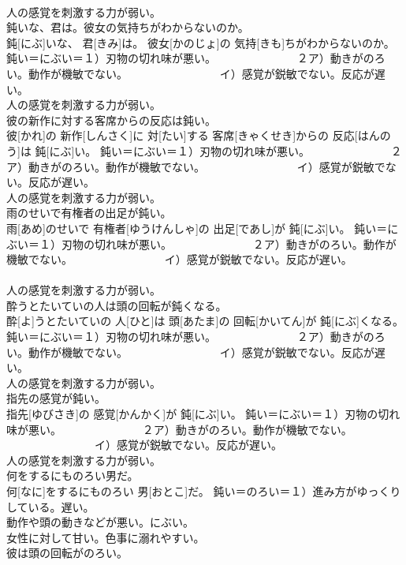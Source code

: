 \documentclass[8pt]{extreport}
\begin{document}
\begin{CJK}{UTF8}{min}
{\\	人の感覚を刺激する力が弱い。
\\	鈍いな、君は。彼女の気持ちがわからないのか。	
\\	鈍[にぶ]いな、 君[きみ]は。 彼女[かのじょ]の 気持[きも]ちがわからないのか。	鈍い＝にぶい＝１）刃物の切れ味が悪い。 　　　　　　　２ア）動きがのろい。動作が機敏でない。 　　　　　　　　イ）感覚が鋭敏でない。反応が遅い。 　　　　　　　
\\	人の感覚を刺激する力が弱い。
\\	彼の新作に対する客席からの反応は鈍い。	
\\	彼[かれ]の 新作[しんさく]に 対[たい]する 客席[きゃくせき]からの 反応[はんのう]は 鈍[にぶ]い。	鈍い＝にぶい＝１）刃物の切れ味が悪い。 　　　　　　　２ア）動きがのろい。動作が機敏でない。 　　　　　　　　イ）感覚が鋭敏でない。反応が遅い。 　　　　　　　
\\	人の感覚を刺激する力が弱い。
\\	雨のせいで有権者の出足が鈍い。	
\\	雨[あめ]のせいで 有権者[ゆうけんしゃ]の 出足[であし]が 鈍[にぶ]い。	鈍い＝にぶい＝１）刃物の切れ味が悪い。 　　　　　　　２ア）動きがのろい。動作が機敏でない。 　　　　　　　　イ）感覚が鋭敏でない。反応が遅い。 　　　　　　　
\\	人の感覚を刺激する力が弱い。
\\	酔うとたいていの人は頭の回転が鈍くなる。	
\\	酔[よ]うとたいていの 人[ひと]は 頭[あたま]の 回転[かいてん]が 鈍[にぶ]くなる。	鈍い＝にぶい＝１）刃物の切れ味が悪い。 　　　　　　　２ア）動きがのろい。動作が機敏でない。 　　　　　　　　イ）感覚が鋭敏でない。反応が遅い。 　　　　　　　
\\	人の感覚を刺激する力が弱い。
\\	指先の感覚が鈍い。	
\\	指先[ゆびさき]の 感覚[かんかく]が 鈍[にぶ]い。	鈍い＝にぶい＝１）刃物の切れ味が悪い。 　　　　　　　２ア）動きがのろい。動作が機敏でない。 　　　　　　　　イ）感覚が鋭敏でない。反応が遅い。 　　　　　　　
\\	人の感覚を刺激する力が弱い。
\\	何をするにものろい男だ。	
\\	何[なに]をするにものろい 男[おとこ]だ。	鈍い＝のろい＝１）進み方がゆっくりしている。遅い。 　　　　　　　
\\	動作や頭の動きなどが悪い。にぶい。 　　　　　　　
\\	女性に対して甘い。色事に溺れやすい。
\\	彼は頭の回転がのろい。	
}
\end{CJK}
\end{document}
